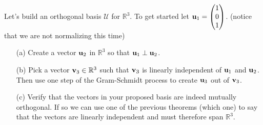 \begin{problem}
    Let's build an orthogonal basis $\mathcal{U}$ for $\mathbb{R}^3$.  To get started let
    ${\bf u}_1 = \begin{pmatrix} 1\\0\\1\end{pmatrix}$.  (notice that we are not
        normalizing this time)
        \begin{enumerate}
            \item[(a)] Create a vector ${\bf u}_2$ in $\mathbb{R}^3$ so that ${\bf u}_1 \perp
                {\bf u}_2$.
            \item[(b)] Pick a vector ${\bf v}_3 \in \mathbb{R}^3$ such that ${\bf v}_3$ is
                linearly independent of ${\bf u}_1$ and ${\bf u}_2$.  Then use one step of the
                Gram-Schmidt process to create ${\bf u}_3$ out of ${\bf v}_3$.
            \item[(c)] Verify that the vectors in your proposed basis are indeed mutually
                orthogonal.  If so we can use one of the previous theorems (which one) to
                say that the vectors are linearly independent and must therefore span
                $\mathbb{R}^3$.
        \end{enumerate}
\end{problem}


